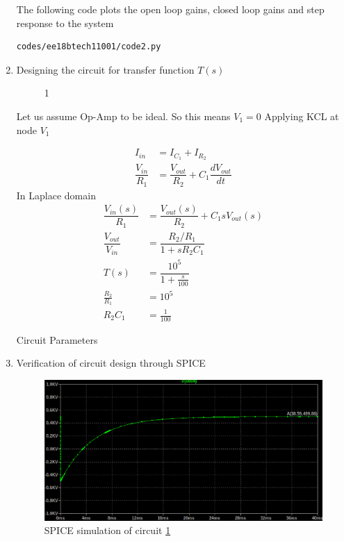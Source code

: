 \begin{enumerate}[label=\thesection.\arabic*.,ref=\thesection.\theenumi]
The following code plots the open loop gains, closed loop gains and step response to the system
\begin{lstlisting}
codes/ee18btech11001/code2.py
\end{lstlisting}


\item Designing the circuit for transfer function $T(s)$
\begin{figure}[!hbt]
	\begin{center}
			\resizebox{\columnwidth}{!}{}
	\end{center}
\caption{1}
\label{fig:equivalent_system1}
\end{figure}

Let us assume Op-Amp to be ideal. So this means $V_{1}=0$
Applying KCL at node $V_{1}$

\begin{align}
I_{in} &= I_{C_{1}} + I_{R_{2}}
\\
\dfrac{V_{in}}{R_{1}} &= \dfrac{V_{out}}{R_{2}} + C_{1}\dfrac{dV_{out}}{dt}
\end{align}
In Laplace domain
\begin{align}
\dfrac{V_{in}(s)}{R_{1}} &= \dfrac{V_{out}(s)}{R_{2}} + C_{1}sV_{out}(s)
\\
\dfrac{V_{out}}{V_{in}} &= \dfrac{R_{2}/R_{1}}{1+sR_{2}C_{1}}
\\
T(s) &= \dfrac{10^{5}}{1+\frac{s}{100}}
\\
\frac{R_{2}}{R_{1}} &= 10^{5}
\\
R_{2}C_{1} &= \frac{1}{100}
\end{align}


\begin{table}[!ht]
\centering

\caption{Circuit Parameters}
\label{table:ee18btech11001_params2}
\end{table}

\item Verification of circuit design through SPICE

\begin{figure}[!ht]
\centering
    \includegraphics[width=\columnwidth]{./figs/ee18btech11001/Figure_4.eps}
  \caption{SPICE simulation of circuit \ref{fig:equivalent_system1}}
  \label{fig:ee18btech11001_fig5}
\end{figure}


\end{enumerate}
